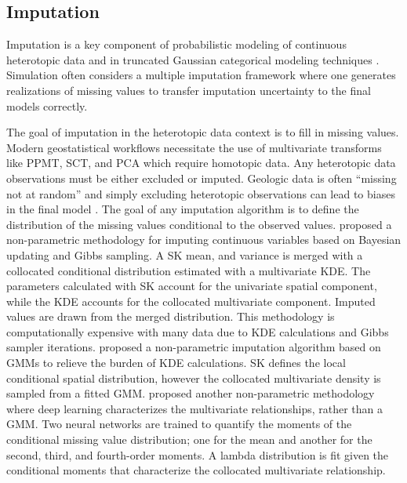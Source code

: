 \subsection{Imputation}
\label{subsec:01impute}

Imputation is a key component of probabilistic modeling of continuous heterotopic data \citep{barnett2015multivariate,silva2018multivariate,hadavand2023spatial} and in truncated Gaussian categorical modeling techniques \citep{silva2018enhanced,arroyo2020iterative,madani2021enhanced,armstrong2011plurigaussian}. Simulation often considers a multiple imputation framework \citep{little2019statistical} where one generates realizations of missing values to transfer imputation uncertainty to the final models correctly.

The goal of imputation in the heterotopic data context is to fill in missing values. Modern geostatistical workflows necessitate the use of multivariate transforms like \gls{PPMT}, \gls{SCT}, and \gls{PCA} which require homotopic data. Any heterotopic data observations must be either excluded or imputed. Geologic data is often ``missing not at random'' and simply excluding heterotopic observations can lead to biases in the final model \citep{dasilva2019treatment}. The goal of any imputation algorithm is to define the distribution of the missing values conditional to the observed values. \cite{barnett2015multivariate} proposed a non-parametric methodology for imputing continuous variables based on Bayesian updating and Gibbs sampling. A \gls{SK} mean, and variance is merged with a collocated conditional distribution estimated with a multivariate \gls{KDE}. The parameters calculated with \gls{SK} account for the univariate spatial component, while the \gls{KDE} accounts for the collocated multivariate component. Imputed values are drawn from the merged distribution. This methodology is computationally expensive with many data due to \gls{KDE} calculations and Gibbs sampler iterations. \cite{silva2018multivariate} proposed a non-parametric imputation algorithm based on \glspl{GMM} to relieve the burden of \gls{KDE} calculations. \Gls{SK} defines the local conditional spatial distribution, however the collocated multivariate density is sampled from a fitted \gls{GMM}. \cite{hadavand2023spatial} proposed another non-parametric methodology where deep learning characterizes the multivariate relationships, rather than a \gls{GMM}. Two neural networks are trained to quantify the moments of the conditional missing value distribution; one for the mean and another for the second, third, and fourth-order moments. A lambda distribution is fit given the conditional moments that characterize the collocated multivariate relationship.

